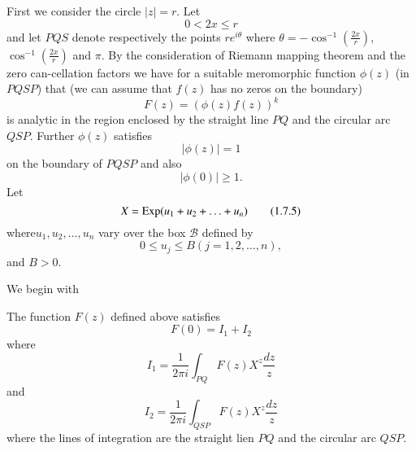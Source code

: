 \begin{step}\label{c1:step1}
First we consider the circle $|z|=r$. Let
\begin{equation*}
 0 < 2x \leq r\tag{1.7.1} \label{c1:eq1.7.1}
\end{equation*}
and let $PQS$ denote respectively the points $re^{i\theta}$ where $\theta = - \cos^{-1} (\frac{2x}{r})$, $\cos^{-1}(\frac{2x}{r})$ and $\pi$. By the consideration of Riemann mapping theorem and the zero can-cellation factors we have for a suitable meromorphic function $\phi(z)$ (in $PQSP$) that (we can assume that $f(z)$ has no zeros on the boundary)
\begin{equation*}
F(z) = (\phi(z) f(z))^k \tag{1.7.2}\label{c1:eq1.7.2}
\end{equation*}
is analytic in the region enclosed by the straight line $PQ$ and the circular arc $QSP$. Further $\phi(z)$ satisfies
\begin{equation*}
|\phi(z)| =1 \tag{1.7.3}\label{c1:eq1.7.3}
\end{equation*}
on the boundary of $PQSP$ and also
\begin{equation*}
|\phi (0)| \geq 1. \tag{1.7.4}\label{c1:eq1.7.4}
\end{equation*}
Let 
\begin{equation*}
X = \operatorname{Exp} (u_1 + u_2 + \ldots + u_n) \tag{1.7.5}\label{c1:eq1.7.5}
\end{equation*}
where\pageoriginale $u_1, u_2, \ldots, u_n$ vary over the box $\mathcal{B}$ defined by
$$
0 \leq u_j \leq B(j = 1, 2, \ldots, n),
$$
and $B>0$.
\end{step}

We begin with

\setcounter{lem}{0}
\begin{lem}\label{c1:lem1d}
The function $F(z)$ defined above satisfies
\begin{equation*}
F(0) = I_1 + I_2 \tag{1.7.6}\label{c1:eq1.7.6}
\end{equation*}
where 
\begin{equation*}
I_1 = \frac{1}{2 \pi i} \int_{PQ} F(z) X^z \frac{dz}{z} \tag{1.7.7}\label{c1:eq1.7.7}
\end{equation*}
and 
\begin{equation*}
I_2 = \frac{1}{2 \pi i} \int_{QSP} F(z) X^z \frac{dz}{z} \tag{1.7.8}\label{c1:eq1.7.8}
\end{equation*}
where the lines of integration are the straight lien $PQ$ and the circular arc $QSP$.
\end{lem}


